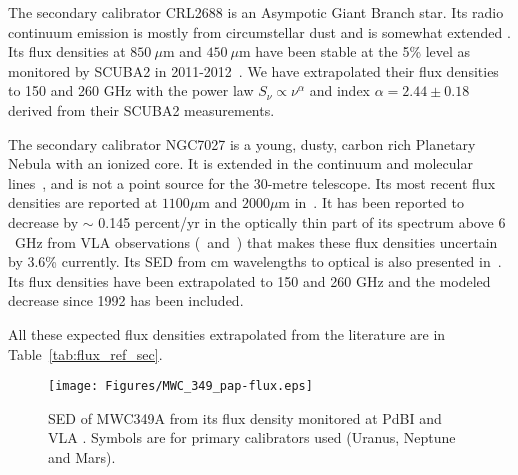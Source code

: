 
The secondary calibrator CRL2688 is an Asympotic Giant Branch
star. Its radio continuum emission is mostly from circumstellar dust
and is somewhat extended \cite{Knapp}.  Its flux densities at
$850\ \mu$m and $450 \ \mu$m have been stable at the 5\% level as
monitored by SCUBA2 in 2011-2012~\cite{Dempsey}.
We have extrapolated their flux densities to 150 and 260 GHz
with the power law $S_{\nu} \propto \nu^{\alpha}$ and index
$\alpha=2.44\pm0.18$ derived from their SCUBA2 measurements.


The secondary calibrator NGC7027 is a young, dusty, carbon rich
Planetary Nebula with an ionized core.  It is extended in the
continuum and molecular lines~\cite{Bieging1991}, and is not a point
source for the 30-metre telescope.  Its most recent flux densities are
reported at $1100\mu$m and $2000\mu$m in~\cite{Hoare1992}. It has
been reported to decrease by $\sim$ 0.145 percent/yr in the optically
thin part of its spectrum above $6$~GHz from VLA
observations (\cite{Zijlstra2008}~and~\cite{Hafez2008}) that makes
these flux densities uncertain by 3.6\% currently. Its SED from cm
wavelengths to optical is also presented in~\cite{Hafez2008}.
Its flux densities have been extrapolated to 150 and 260 GHz and the
modeled decrease since 1992 has been included.

All these expected flux densities extrapolated from the literature are in Table~\ref{tab:flux_ref_sec}.

\begin{figure}[h]
\begin{center}
  \texttt{[image: Figures/MWC\_349\_pap-flux.eps]}
  \caption[MWC349 spectral energy density]{SED of MWC349A from its flux density monitored at PdBI and VLA \cite{krips}.
  Symbols are for primary calibrators used (Uranus, Neptune and Mars).}
\label{fig:Krips2017}
\end{center}
\end{figure}




